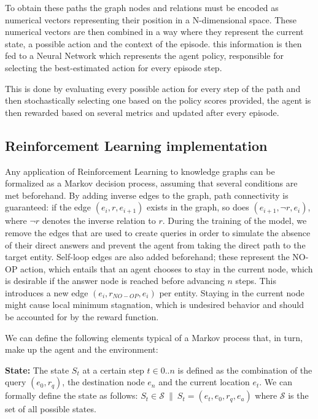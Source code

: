 To obtain these paths the graph nodes and relations must be encoded as numerical vectors representing their position in a N-dimensional space. 
These numerical vectors are then combined in a way where they represent the current state, a possible action and the context of the episode. this information is then fed to a Neural Network which represents the agent policy, responsible for selecting the best-estimated action for every episode step.

This is done by evaluating every possible action for every step of the path and then stochastically selecting one based on the policy scores provided, the agent is then rewarded based on several metrics and updated after every episode.


\subsection{Reinforcement Learning implementation}\label{sec:spacerl-rlimplementation}

Any application of Reinforcement Learning to knowledge graphs can be formalized as a Markov decision process, assuming that several conditions are met beforehand. By adding inverse edges to the graph, path connectivity is guaranteed: if the edge $(e_i,r,e_{i+1})$ exists in the graph, so does $(e_{i+1},\neg r,e_i)$, where $\neg r$ denotes the inverse relation to $r$. During the training of the model, we remove the edges that are used to create queries in order to simulate the absence of their direct answers and prevent the agent from taking the direct path to the target entity. Self-loop edges are also added beforehand; these represent the NO-OP action, which entails that an agent chooses to stay in the current node, which is desirable if the answer node is reached before advancing $n$ steps. This introduces a new edge $(e_i,r_{NO-OP},e_i)$ per entity. Staying in the current node might cause local minimum stagnation, which is undesired behavior and should be accounted for by the reward function.

We can define the following elements typical of a Markov process that, in turn, make up the agent and the environment:

\textbf{State:} The state $S_t$ at a certain step $t \in 0..n$ is defined as the combination of the query $(e_0, r_q)$, the destination node $e_n$ and the current location $e_t$. We can formally define the state as follows: $S_t \in \mathcal{S} ~\|~ S_t = (e_t, e_0, r_q, e_a)$ where $\mathcal{S}$ is the set of all possible states.

